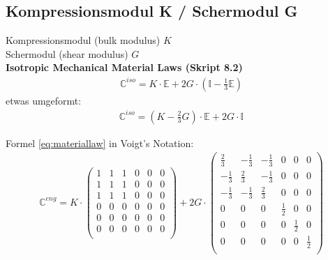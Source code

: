 \documentclass[a4paper, 10pt]{scrartcl}
\begin{document}
\subsection{Kompressionsmodul K / Schermodul G}

Kompressionsmodul (bulk modulus) $K$\\

Schermodul (shear modulus) $G$\\

\textbf{Isotropic Mechanical Material Laws (Skript 8.2)}\\


\begin{align}\label{eq:materiallaw}
	\mathbb{C}^{iso} = K \cdot \mathbb{E} + 2G \cdot (\mathbb{I} - \frac{1}{3}
	\mathbb{E})
\end{align}
etwas umgeformt:
\begin{align}
	\mathbb{C}^{iso} = (K - \frac{2}{3} G) \cdot \mathbb{E} + 2G \cdot \mathbb{I}
\end{align}

Formel \ref{eq:materiallaw} in Voigt's Notation:
\begin{align}
	\mathbb{C}^{eng} = K \cdot \begin{pmatrix}
		1 & 1 & 1 & 0 & 0 & 0\\
		1 & 1 & 1 & 0 & 0 & 0\\
		1 & 1 & 1 & 0 & 0 & 0\\
		0 & 0 & 0 & 0 & 0 & 0\\
		0 & 0 & 0 & 0 & 0 & 0\\
		0 & 0 & 0 & 0 & 0 & 0\\
	\end{pmatrix}
	+ 2 G \cdot \begin{pmatrix}
		\frac{2}{3} & -\frac{1}{3} & -\frac{1}{3} & 0 & 0 & 0\\
		-\frac{1}{3} & \frac{2}{3} & -\frac{1}{3} & 0 & 0 & 0\\
		-\frac{1}{3} & -\frac{1}{3} & \frac{2}{3} & 0 & 0 & 0\\
		0 & 0 & 0 & \frac{1}{2} & 0 & 0\\
		0 & 0 & 0 & 0 & \frac{1}{2} & 0\\
		0 & 0 & 0 & 0 & 0 & \frac{1}{2}\\
	\end{pmatrix}
\end{align}
\end{document}
